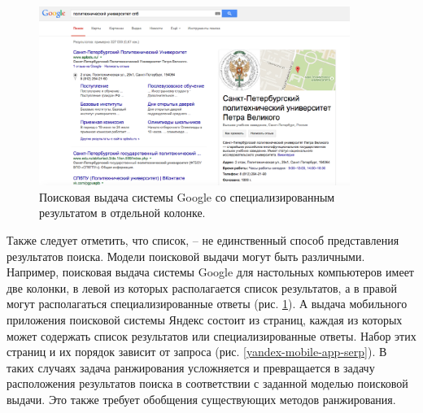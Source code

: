 \documentclass[12pt,a4paper]{report}
\newcommand\figref[1]{(рис. \ref{#1})}
\begin{document}
\begin{figure}[t!]
  \centering
  \includegraphics[width=0.9\textwidth]{pics/EntitySearch-Google.png}
  \caption{Поисковая выдача системы Google со специализированным результатом в отдельной колонке.}
  \label{two-coloumn-serp}
\end{figure}

Также следует отметить, что список, -- не единственный способ представления результатов поиска. Модели поисковой выдачи могут быть различными. Например, поисковая выдача системы Google для настольных компьютеров имеет две колонки, в левой из которых располагается список результатов, а в правой могут располагаться специализированные ответы \figref{two-coloumn-serp}. А выдача мобильного приложения поисковой системы Яндекс состоит из страниц, каждая из которых может содержать список результатов или специализированные ответы. Набор этих страниц и их порядок зависит от запроса \figref{yandex-mobile-app-serp}. В таких случаях задача ранжирования усложняется и превращается в задачу расположения результатов поиска в соответствии с заданной моделью поисковой выдачи. Это также требует обобщения существующих методов ранжирования.
\end{document}
